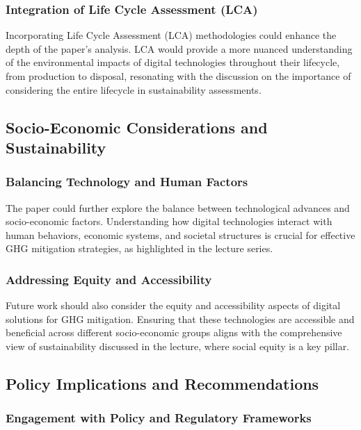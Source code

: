 \documentclass[conference,compsoc]{IEEEtran}
\begin{document}
\subsubsection{Integration of Life Cycle Assessment (LCA)}

Incorporating Life Cycle Assessment (LCA) methodologies could enhance the depth of the paper's analysis. LCA would provide a more nuanced understanding of the environmental impacts of digital technologies throughout their lifecycle, from production to disposal, resonating with the  discussion on the importance of considering the entire lifecycle in sustainability assessments.

\subsection{Socio-Economic Considerations and Sustainability}

\subsubsection{Balancing Technology and Human Factors}

The paper could further explore the balance between technological advances and socio-economic factors. Understanding how digital technologies interact with human behaviors, economic systems, and societal structures is crucial for effective GHG mitigation strategies, as highlighted in the lecture series.

\subsubsection{Addressing Equity and Accessibility}

Future work should also consider the equity and accessibility aspects of digital solutions for GHG mitigation. Ensuring that these technologies are accessible and beneficial across different socio-economic groups aligns with the comprehensive view of sustainability discussed in the lecture, where social equity is a key pillar.

\subsection{Policy Implications and Recommendations}

\subsubsection{Engagement with Policy and Regulatory Frameworks}
\end{document}
